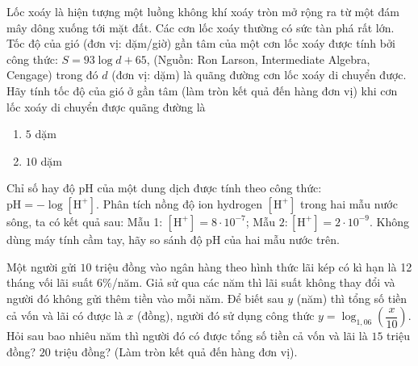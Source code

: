 \begin{vd}%
	Lốc xoáy là hiện tượng một luồng không khí xoáy tròn mở rộng ra từ một đám mây dông xuống tới mặt đất. Các cơn lốc xoáy thường có sức tàn phá rất lớn. Tốc độ của gió (đơn vị: dặm/giờ) gần tâm của một cơn lốc xoáy được tính bởi công thức: $S=93 \log d+65$, (Nguồn: Ron Larson, Intermediate Algebra, Cengage) trong đó $d$ (đơn vị: dặm) là quãng đường cơn lốc xoáy di chuyển được. Hãy tính tốc độ của gió ở gần tâm (làm tròn kết quả đến hàng đơn vị) khi cơn lốc xoáy di chuyển được quãng đường là
	\begin{multicols}{2}
		\begin{enumerate}
			\item $5$ dặm
			\item $10$ dặm
		\end{enumerate}
	\end{multicols}
\end{vd}
\begin{vd}%
	Chỉ số hay độ pH của một dung dịch được tính theo công thức: $\mathrm{pH}=-\log \left[\mathrm{H}^{+}\right]$. Phân tích nồng độ ion hydrogen $\left[\mathrm{H}^{+}\right]$ trong hai mẫu nước sông, ta có kết quả sau: Mẫu 1: $\left[\mathrm{H}^{+}\right]=8 \cdot 10^{-7}$; Mẫu $2:\left[\mathrm{H}^{+}\right]=2 \cdot 10^{-9}$.
	Không dùng máy tính cầm tay, hãy so sánh độ pH của hai mẫu nước trên.
\end{vd}

\begin{vd}%
	Một người gửi $10$ triệu đồng vào ngân hàng theo hình thức lãi kép có kì hạn là 12 tháng vối lãi suất $6\%$/năm. Giả sử qua các năm thì lãi suất không thay đổi và người đó không gửi thêm tiền vào mỗi năm. Để biết sau $y$ (năm) thì tổng số tiền cả vốn và lãi có được là $x$ (đồng), người đó sử dụng công thức $y=\log_{1,06}\left(\dfrac{x}{10}\right)$. Hỏi sau bao nhiêu năm thì người đó có được tổng số tiền cả vốn và lãi là $15$ triệu đồng? $20$ triệu đồng? (Làm tròn kết quả đến hàng đơn vị).
\end{vd}
